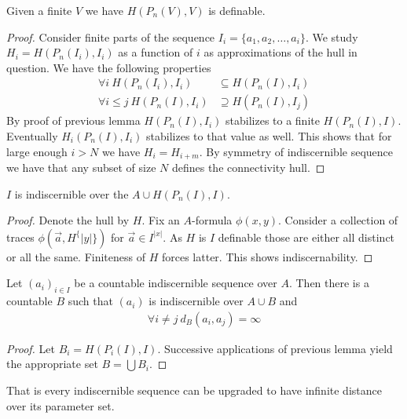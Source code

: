 \documentclass{amsart}
\begin{document}
\begin{Note}
	Given a finite $V$ we have $H(P_n(V), V)$ is definable.
\end{Note}

\begin{proof}
	Consider finite parts of the sequence $I_i = \{a_1, a_2, \ldots, a_i\}$. We study $H_i = H(P_n(I_i), I_i)$ as a function of $i$ as approximations of the hull in question. We have the following properties
	\begin{align*}
		 \forall i \ H(P_n(I_i), I_i) &\subseteq H(P_n(I), I_i) \\
		 \forall i \leq j \ H(P_n(I), I_i) &\supseteq H(P_n(I), I_j)
	\end{align*}
	By proof of previous lemma $H(P_n(I), I_i)$ stabilizes to a finite $H(P_n(I), I)$. Eventually $H_i(P_n(I), I_i)$ stabilizes to that value as well. This shows that for large enough $i>N$ we have $H_i = H_{i+m}$. By symmetry of indiscernible sequence we have that any subset of size $N$ defines the connectivity hull.
\end{proof}

\begin{Lemma}
	$I$ is indiscernible over the $A \cup H(P_n(I), I)$.
\end{Lemma}

\begin{proof}
	Denote the hull by $H$. Fix an $A$-formula $\phi(x,y)$. Consider a collection of traces $\phi(\vec a, H^\{|y|\})$ for $\vec a \in I^{|x|}$. As $H$ is $I$ definable those are either all distinct or all the same. Finiteness of $H$ forces latter. This shows indiscernability.
\end{proof}

\begin{Corollary}
	Let $(a_i)_{i \in I}$ be a countable indiscernible sequence over $A$. Then there is a countable $B$ such that  $(a_i)$ is indiscernible over $A \cup B$ and
	\begin{align*}
		\forall i \neq j \ d_B(a_i, a_j) = \infty
	\end{align*}
\end{Corollary}

\begin{proof}
	Let $B_i = H(P_i(I), I)$. Successive applications of previous lemma yield the appropriate set $B = \bigcup B_i$.
\end{proof}

That is every indiscernible sequence can be upgraded to have infinite distance over its parameter set.
\end{document}
